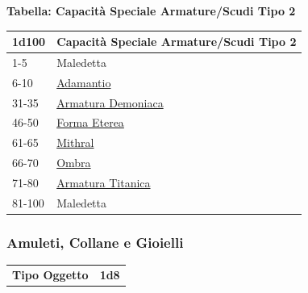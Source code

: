 \begin{multicols}{2}
{%

\textbf{Tabella: Capacità Speciale Armature/Scudi Tipo 2}\hypertarget{Capacità Speciale Armature / Scudi Tipo 2}{}

\medskip

{\small\begin{tabularx}{0.45\textwidth}{lX}
		\toprule
\textbf{1d100} & \textbf{Capacità Speciale Armature/Scudi Tipo 2}\\
\toprule
1-5 & Maledetta\\
6-10 &\hyperlink{Adamantio}{Adamantio}\\
31-35& \hyperlink{ArmaturaDemoniaca}{Armatura Demoniaca}\\
46-50& \hyperlink{FormaEterea}{Forma Eterea}\\
61-65 &\hyperlink{Mithral}{Mithral}\\
66-70 &\hyperlink{armaOmbra}{Ombra}\\
71-80 &\hyperlink{Armatura Titanica}{Armatura Titanica}\\
81-100 & Maledetta\\
\end{tabularx}}

\subsubsection{Amuleti, Collane e Gioielli}\hypertarget{amuleticollanegioielli}{}\label{amuleticollanegioielli}

{\small\begin{tabular}{ll}
\textbf{Tipo Oggetto}&\textbf{1d8}\\
\end{tabular}}

\medskip\hypertarget{amuleticollanegioielli1}{}

}
\end{multicols}
